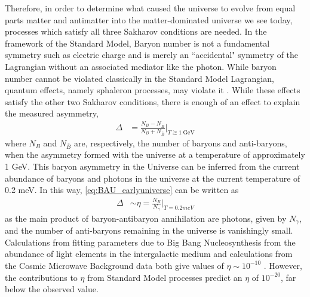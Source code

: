 Therefore, in order to determine what caused the universe to evolve from equal parts matter and antimatter into the matter-dominated universe we see today, processes which satisfy all three Sakharov conditions are needed.
In the framework of the Standard Model, Baryon number is not a fundamental symmetry such as electric charge and is merely an ``accidental" symmetry of the Lagrangian without an associated mediator like the photon.
While baryon number cannot be violated classically in the Standard Model Lagrangian, quantum effects, namely sphaleron processes, may violate it \cite{PhysRevLett.37.8, KUZMIN198536}.
While these effects satisfy the other two Sakharov conditions, there is enough of an effect to explain the measured asymmetry,
\begin{align}
\Delta &= \frac{N_B - N_{\bar{B}}} {N_B + N_{\bar{B}}} \biggr\rvert_{T \gtrsim 1~\textrm{GeV}}
\label{eq:BAU_earlyuniverse}
\end{align}
where $N_B$ and $N_{\bar{B}}$ are, respectively, the number of baryons and anti-baryons, when the asymmetry formed with the universe at a temperature of approximately 1 GeV.
This baryon asymmetry in the Universe can be inferred from the current abundance of baryons and photons in the universe at the current temperature of 0.2 meV.
In this way, \autoref{eq:BAU_earlyuniverse} can be written as
\begin{align}
    \Delta &\sim \eta = \frac{N_B}{N_\gamma} \biggr\rvert_{T = 0.2 meV}
    \label{eq:eta_lateuniverse}
\end{align}
as the main product of baryon-antibaryon annihilation are photons, given by $N_\gamma$, and the number of anti-baryons remaining in the universe is vanishingly small.
Calculations from fitting parameters due to Big Bang Nucleosynthesis from the abundance of light elements in the intergalactic medium and calculations from the Cosmic Microwave Background data both give values of $\eta\sim 10^{-10}$ \cite{Canetti:2012zc}.
However, the contributions to $\eta$ from Standard Model processes predict an $\eta$ of $10^{-20}$, far below the observed value.

